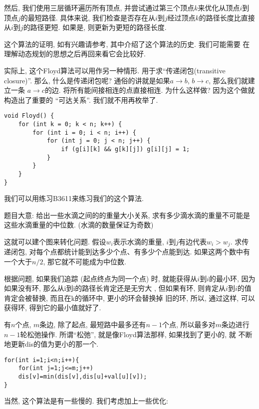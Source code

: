 然后, 我们使用三层循环遍历所有顶点, 并尝试通过第三个顶点$k$来优化从顶点$i$到顶点$j$的最短路径. 
具体来说, 我们检查是否存在从$i$到$j$经过顶点$k$的路径长度比直接从$i$到$j$的路径更短. 
如果是, 则更新为更短的路径长度. 

这个算法的证明, 如有兴趣请参考\cite{algobook}, 其中介绍了这个算法的历史. 我们可能需要
在理解动态规划的思想之后再回来看它会比较好. 

实际上, 这个Floyd算法可以用作另一种情形. 用于求``传递闭包(transitive closure)''. 
那么, 什么是传递闭包呢? 通俗的讲就是如果$a\to b$,  $b\to c$, 那么我们就建立一条
$a\to c$的边. 将所有能间接相连的点直接相连. 为什么这样做? 因为这个做就构造出了重要的
``可达关系''. 我们就不用再枚举了. 

\begin{lstlisting}
void Floyd() {
    for (int k = 0; k < n; k++) {
        for (int i = 0; i < n; i++) {
            for (int j = 0; j < n; j++) {
                if (g[i][k] && g[k][j]) g[i][j] = 1;  
            }
        }
    }
}
\end{lstlisting}

 我们可以用练习B3611来练习我们的这个算法. 

题目大意: 给出一些水滴之间的的重量大小关系, 求有多少滴水滴的重量不可能是这些水滴重量的中位数.  (水滴的数量保证为奇数) 

这就可以建个图来转化问题. 假设$w_i$表示水滴的重量, $i$到$j$有边代表$w_i>w_j$. 
求传递闭包, 对每个点都统计能到达多少个点、有多少个点能到达. 
如果这两个数中有一个大于$n/2$, 那它就不可能成为中位数. 

 根据问题, 如果我们追踪 (起点终点为同一个点) 时, 
就能获得从$i$到$i$的最小环, 因为如果没有环, 那么从i到i的路径长肯定还是无穷大
, 但如果有环, 则肯定从$i$到$i$的值肯定会被替换, 而且在k的循环中, 更小的环会替换掉
旧的环, 所以, 通过这样, 可以获得环, 得到它的最小值就好了. 

 有$n$个点, $m$条边, 除了起点, 最短路中最多还有$n-1$个点, 
所以最多对$m$条边进行$n-1$轮松弛操作. 所谓``松弛'', 就是像Floyd算法那样, 如果找到了更小的, 就
不断地更新dis的值为更小的那一个. 
\begin{lstlisting}
for(int i=1;i<n;i++){
    for(int j=1;j<=m;j++)
    dis[v]=min(dis[v],dis[u]+val[u][v]);
}    
\end{lstlisting}

当然, 这个算法是有一些慢的. 我们考虑加上一些优化: 

